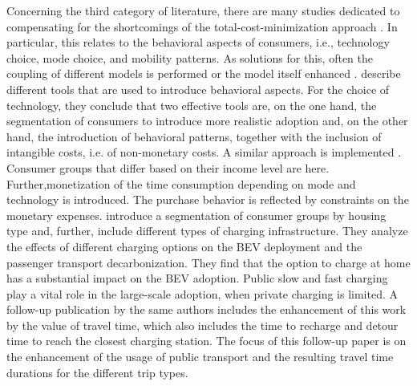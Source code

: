 \documentclass[preprint,review,11pt, authoryear]{elsarticle}
\begin{document}
    Concerning the third category of literature, there are many studies dedicated to compensating for the shortcomings of the total-cost-minimization approach \citep{TATTINI2018265, PATIL2023104265}. In particular, this relates to the behavioral aspects of consumers, i.e., technology choice, mode choice, and mobility patterns. As solutions for this, often the coupling of different models is performed or the model itself enhanced \citep{luh2022behavior}.   describe different tools that are used to introduce behavioral aspects. For the choice of technology, they conclude that two effective tools are, on the one hand, the segmentation of consumers to introduce more realistic adoption and, on the other hand, the introduction of behavioral patterns, together with the inclusion of intangible costs, i.e. of non-monetary costs. A similar approach is implemented . Consumer groups that differ based on their income level are  here. Further,monetization of the time consumption depending on mode and technology is introduced. The purchase behavior is reflected by constraints on the monetary expenses. \citet{luh2022behavior} introduce a segmentation of consumer groups by housing type and, further, include different types of charging infrastructure. They analyze the effects of different charging options on the BEV deployment and the passenger transport decarbonization. They find that the option to charge at home has a substantial impact on the BEV adoption. Public slow and fast charging play a vital role in the large-scale adoption, when private charging is limited. 
    A follow-up publication by the same authors \citep{LUH2024122412} includes the enhancement of this work by  the value of travel time, which also includes the time to recharge and detour time to reach the closest charging station. The focus of this follow-up paper is on the enhancement of the usage of public transport and the resulting travel time durations for the different trip types.
    
    
    
    

    
\end{document}
